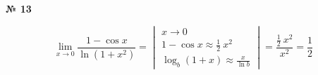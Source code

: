 \documentclass{article}
\begin{document}
\textbf{№ 13} 
\large

$$ \lim\limits_{x \to 0} \frac{1-\cos{x}}{\ln{(1+x^2)}}
= \begin{vmatrix}
        x \to 0 \\
        1 - \cos{x} \approx \frac{1}{2} \ x^2 \\
        \log_b(1+x) \approx \frac{x}{\ln{b}}
   \end{vmatrix}
= \frac{\frac{1}{2} \ x^2}{x^2} 
= \frac{1}{2} $$  
\end{document}

